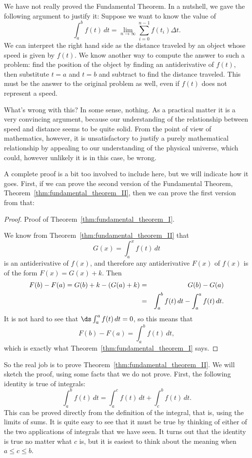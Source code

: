 We have not really proved the Fundamental Theorem. In a nutshell, we
gave the following argument to justify it: Suppose we want to know the
value of 
$$
  \int_a^b f(t)\,dt = \lim_{n\to\infty}\sum_{i=0}^{n-1} f(t_i)\Delta t.
$$
We can interpret the right hand side as the distance traveled by an
object whose speed is given by $f(t)$. We know another way to compute
the answer to such a problem: find the position of the object by
finding an antiderivative of $f(t)$, then substitute $t=a$ and $t=b$
and subtract to find the distance traveled. This must be the answer to
the original problem as well, even if $f(t)$ does not represent a
speed.

What's wrong with this? In some sense, nothing. As a practical matter
it is a very convincing argument, because our understanding of the
relationship between speed and distance seems to be quite solid. From
the point of view of mathematics, however, it is unsatisfactory to
justify a purely mathematical relationship by appealing to our
understanding of the physical universe, which could, however unlikely
it is in this case, be wrong.

A complete proof is a bit too involved to include here, but we will
indicate how it goes. First, if we can prove the second version of the
Fundamental Theorem, Theorem~\ref{thm:fundamental_theorem_II}, then
we can prove the first version from that:

\begin{proof} Proof of Theorem~\ref{thm:fundamental_theorem_I}.

We know from Theorem~\ref{thm:fundamental_theorem_II} that 
$$
  G(x)=\int_a^x f(t)\,dt
$$
is an antiderivative of $f(x)$, and therefore any antiderivative
$F(x)$ of $f(x)$ is of the form $F(x)=G(x)+k$. Then 
\begin{eqnarray*}
  F(b)-F(a)=G(b)+k-(G(a)+k) &=& G(b)-G(a)\cr
  &=&\int_a^b f(t)\,dt-\int_a^a f(t)\,dt.\cr
\end{eqnarray*}
It is not hard to see that $\ds \int_a^a f(t)\,dt=0$, so this means that
$$
  F(b)-F(a)=\int_a^b f(t)\,dt,
$$
which is exactly what Theorem~\ref{thm:fundamental_theorem_I} says.
\end{proof}

So the real job is to prove
Theorem~\ref{thm:fundamental_theorem_II}. We will sketch the proof,
using some facts that we do not prove. First, the following identity
is true of integrals:
$$
  \int_a^b f(t)\,dt = \int_a^c f(t)\,dt + \int_c^b f(t)\,dt.
$$
This can be proved directly from the definition of the integral, that
is, using the limits of sums. It is quite easy to see that it must be
true by thinking of either of the two applications of integrals that
we have seen. It turns out that the identity is true no matter what
$c$ is, but it is easiest to think about the meaning when 
$a\le c\le b$.

